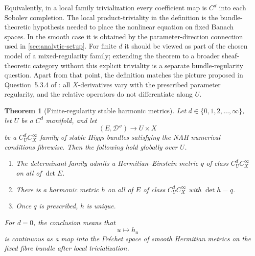 \documentclass[11pt,reqno]{amsart}
\newtheorem{theorem}{Theorem}[section]
\theoremstyle{definition}
\theoremstyle{remark}
\newcommand{\cD}{\mathcal D}
\begin{document}
Equivalently, in a local family trivialization every coefficient map is $C^d$ into each Sobolev completion.  The local product-triviality in the definition is the bundle-theoretic hypothesis needed to place the nonlinear equation on fixed Banach spaces.  In the smooth case it is obtained by the parameter-direction connection used in \cref{sec:analytic-setup}.  For finite $d$ it should be viewed as part of the chosen model of a mixed-regularity family; extending the theorem to a broader sheaf-theoretic category without this explicit triviality is a separate bundle-regularity question.  Apart from that point, the definition matches the picture proposed in Question~5.3.4 of \cite{AzamRayan2026}: all $X$-derivatives vary with the prescribed parameter regularity, and the relative operators do not differentiate along $U$.

\begin{theorem}[Finite-regularity stable harmonic metrics]\label{thm:Cd-stable-metrics}
Let $d\in\{0,1,2,\ldots,\infty\}$, let $U$ be a $C^d$ manifold, and let
\[
  (E,\cD'')\longrightarrow U\times X
\]
be a $C^d_UC^\infty_X$ family of stable Higgs bundles satisfying the NAH numerical conditions fibrewise.  Then the following hold globally over $U$.
\begin{enumerate}[label=(\roman*)]
\item The determinant family admits a Hermitian--Einstein metric $q$ of class $C^d_UC^\infty_X$ on all of $\det E$.
\item There is a harmonic metric $h$ on all of $E$ of class $C^d_UC^\infty_X$ with $\det h=q$.
\item Once $q$ is prescribed, $h$ is unique.
\end{enumerate}
For $d=0$, the conclusion means that
\[
  u\longmapsto h_u
\]
is continuous as a map into the Fr\'echet space of smooth Hermitian metrics on the fixed fibre bundle after local trivialization.
\end{theorem}
\end{document}
